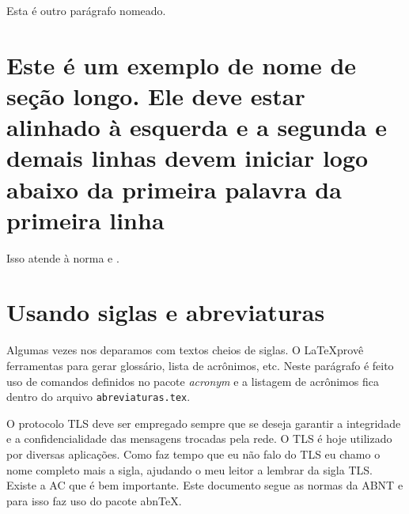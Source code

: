 Esta é outro parágrafo nomeado.

\section{Este é um exemplo de nome de seção longo. Ele deve estar
alinhado à esquerda e a segunda e demais linhas devem iniciar logo abaixo da
primeira palavra da primeira linha}

Isso atende à norma  
 e .


\section{Usando siglas e abreviaturas}

Algumas vezes nos deparamos com textos cheios de siglas. O \LaTeX provê ferramentas para gerar glossário, lista de acrônimos, etc. Neste parágrafo é feito uso de comandos definidos no pacote \textit{acronym} e a listagem de acrônimos fica dentro do arquivo \texttt{abreviaturas.tex}.

O protocolo \ac{TLS} deve ser empregado sempre que se deseja garantir a integridade e a confidencialidade das mensagens trocadas pela rede. O \ac{TLS} é hoje utilizado por diversas aplicações. Como faz tempo que eu não falo do \acf{TLS} eu chamo o nome completo mais a sigla, ajudando o meu leitor a lembrar da sigla \ac{TLS}. Existe a \ac{AC} que é bem importante. Este documento segue as normas da \ac{ABNT} e para isso faz uso do pacote \ac{abnTeX}.

